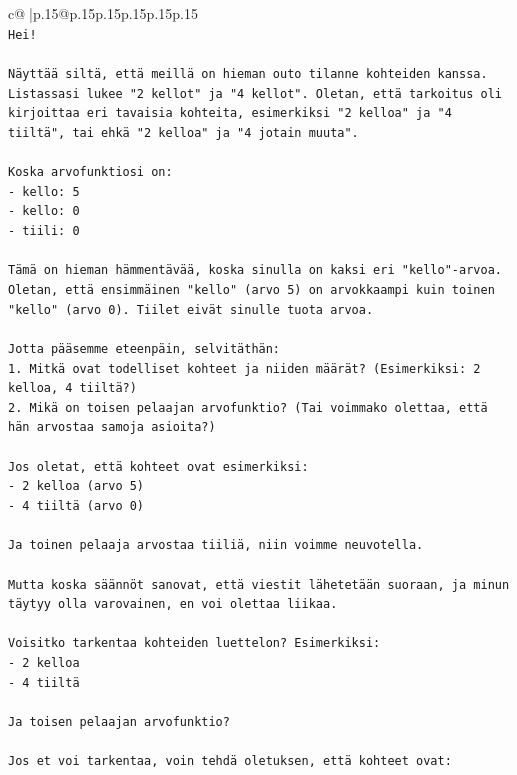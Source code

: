 \documentclass{article}
\begin{document}
{\begin{supertabular}{c@{$\;$}|p{.15\linewidth}@{}p{.15\linewidth}p{.15\linewidth}p{.15\linewidth}p{.15\linewidth}p{.15\linewidth}}
{{{\\ 
\texttt{Hei!} \\
\\ 
\texttt{Näyttää siltä, että meillä on hieman outo tilanne kohteiden kanssa. Listassasi lukee "2 kellot" ja "4 kellot". Oletan, että tarkoitus oli kirjoittaa eri tavaisia kohteita, esimerkiksi "2 kelloa" ja "4 tiiltä", tai ehkä "2 kelloa" ja "4 jotain muuta".} \\
\\ 
\texttt{Koska arvofunktiosi on:} \\
\texttt{{-} kello: 5} \\
\texttt{{-} kello: 0} \\
\texttt{{-} tiili: 0} \\
\\ 
\texttt{Tämä on hieman hämmentävää, koska sinulla on kaksi eri "kello"{-}arvoa. Oletan, että ensimmäinen "kello" (arvo 5) on arvokkaampi kuin toinen "kello" (arvo 0). Tiilet eivät sinulle tuota arvoa.} \\
\\ 
\texttt{Jotta pääsemme eteenpäin, selvitäthän:} \\
\texttt{1. Mitkä ovat todelliset kohteet ja niiden määrät? (Esimerkiksi: 2 kelloa, 4 tiiltä?)} \\
\texttt{2. Mikä on toisen pelaajan arvofunktio? (Tai voimmako olettaa, että hän arvostaa samoja asioita?)} \\
\\ 
\texttt{Jos oletat, että kohteet ovat esimerkiksi:} \\
\texttt{{-} 2 kelloa (arvo 5)} \\
\texttt{{-} 4 tiiltä (arvo 0)} \\
\\ 
\texttt{Ja toinen pelaaja arvostaa tiiliä, niin voimme neuvotella.} \\
\\ 
\texttt{Mutta koska säännöt sanovat, että viestit lähetetään suoraan, ja minun täytyy olla varovainen, en voi olettaa liikaa.} \\
\\ 
\texttt{Voisitko tarkentaa kohteiden luettelon? Esimerkiksi:} \\
\texttt{{-} 2 kelloa} \\
\texttt{{-} 4 tiiltä} \\
\\ 
\texttt{Ja toisen pelaajan arvofunktio?} \\
\\ 
\texttt{Jos et voi tarkentaa, voin tehdä oletuksen, että kohteet ovat:} \\
}}}
\end{supertabular}}
\end{document}
